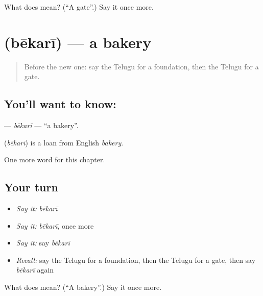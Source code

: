 \begin{tcolorbox}[breakable,colback=teal!4,colframe=teal!35!black,title={Before you move on}]
What does  mean? (\textquotedblleft{}A gate\textquotedblright{}.) Say it once more.
\end{tcolorbox}
\section[\texorpdfstring{\te{బేకరీ} (bēkarī)}{బేకరీ (bēkarī)}]{ (bēkarī) — a bakery}

\label{lesson:TE-C216-bekari}



\begin{quote}
Before the new one: say the Telugu for a foundation, then the Telugu for a gate.
\end{quote}

\subsection*{You'll want to know: }
\textbf{} — \emph{bēkarī} — \textquotedblleft{}a bakery\textquotedblright{}.

\begin{cousinweb}
\textbf{} (\emph{bēkarī}) is a loan from English \emph{bakery}.
\end{cousinweb}

\begin{grammarlens}[title={What you've built}]
One more word for this chapter.
\end{grammarlens}

\subsection*{Your turn}
\begin{itemize}
\raggedright
  \item \emph{Say it:} \emph{bēkarī}
  \item \emph{Say it:} \emph{bēkarī}, once more
  \item \emph{Say it:} say \emph{bēkarī}
  \item \emph{Recall:} say the Telugu for a foundation, then the Telugu for a gate, then say \emph{bēkarī} again
\end{itemize}

\begin{tcolorbox}[breakable,colback=teal!4,colframe=teal!35!black,title={Before you move on}]
What does  mean? (\textquotedblleft{}A bakery\textquotedblright{}.) Say it once more.
\end{tcolorbox}
